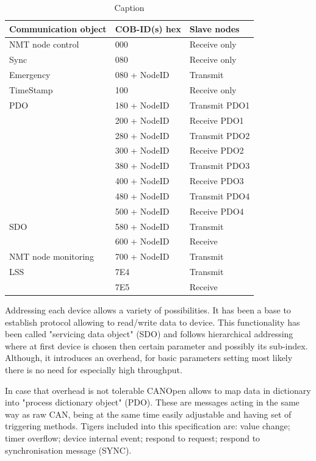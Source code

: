 \begin{table}[]
    \centering
    \begin{tabular}{|p{}|p{}|p{}|}
        \hline
        \textbf{Communication object} & \textbf{COB-ID(s) hex} & \textbf{Slave nodes} \\
        \hline
        NMT node control & 000 & Receive only \\
        \hline
        Sync & 080 & Receive only \\
        \hline
        Emergency & 080 + NodeID & Transmit \\
        \hline
        TimeStamp & 100 & Receive only \\
        \hline
        PDO & 180 + NodeID & Transmit PDO1 \\
            & 200 + NodeID & Receive PDO1 \\
            & 280 + NodeID & Transmit PDO2 \\
            & 300 + NodeID & Receive PDO2 \\
            & 380 + NodeID & Transmit PDO3 \\
            & 400 + NodeID & Receive PDO3 \\
            & 480 + NodeID & Transmit PDO4 \\
            & 500 + NodeID & Receive PDO4 \\
        \hline
        SDO & 580 + NodeID & Transmit \\
            & 600 + NodeID & Receive \\
        \hline
        NMT node monitoring & 700 + NodeID & Transmit \\
        \hline
        LSS & 7E4 & Transmit \\
            & 7E5 & Receive \\
        \hline
    \end{tabular}
    \caption{Caption}
    \label{tab:my_label}
\end{table}

Addressing each device allows a variety of possibilities. It has been a base to establish protocol allowing to read/write data to device.
This functionality has been called "servicing data object" (SDO) and follows hierarchical addressing where at first device is chosen then certain parameter and possibly its sub-index. Although, it introduces an overhead, for basic parameters setting most likely there is no need for especially high throughput. 

In case that overhead is not tolerable CANOpen allows to map data in dictionary into "process dictionary object" (PDO). These are messages acting in the same way as raw CAN, being at the same time easily adjustable and having set of triggering methods.
Tigers included into this specification are: value change; timer overflow; device internal event; respond to request; respond to synchronisation message (SYNC).

